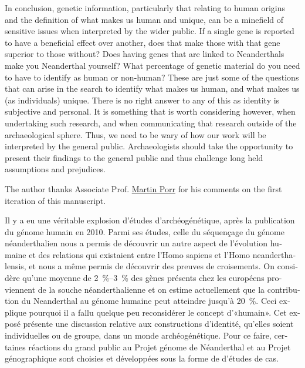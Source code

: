 
In conclusion, genetic information, particularly that relating to human origins and the definition of what makes us human and unique, can be a minefield of sensitive issues when interpreted by the wider public. If a single gene is reported to have a beneficial effect over another, does that make those with that gene superior to those without? Does having genes that are linked to Neanderthals make you Neanderthal yourself? What percentage of genetic material do you need to have to identify as human or non-human? These are just some of the questions that can arise in the search to identify what makes us human, and what makes us (as individuals) unique. There is no right answer to any of this as identity is subjective and personal. It is something that is worth considering however, when undertaking such research, and when communicating that research outside of the archaeological sphere. Thus, we need to be wary of how our work will be interpreted by the general public. Archaeologists should take the opportunity to present their findings to the general public and thus challenge long held assumptions and prejudices.

\myseparator
The author thanks Associate Prof. \href{https://uwa.academia.edu/MartinPorr}{Martin Porr} for his comments on the first iteration of this manuscript.


\begin{myabstract}
\foreignlanguage{french}{Il y a eu une véritable explosion d’études d’archéogénétique, après la publication du génome humain en 2010. Parmi ses études, celle du séquençage du génome néanderthalien nous a permis de découvrir un autre aspect de l’évolution humaine et des relations qui existaient entre l’Homo sapiens et l’Homo neanderthalensis, et nous a même permis de découvrir des preuves de croisements. 
On considère qu’une moyenne de \SIrange[range-phrase=--]{2}{3}{\percent} des gènes présents chez les européens proviennent de la souche
néanderthalienne et on estime actuellement que la contribution du Neanderthal au génome humaine peut atteindre jusqu’à \SI{20}{\percent}. 
Ceci explique pourquoi il a fallu quelque peu reconsidérer le concept d’«humain». 
Cet exposé présente une discussion relative aux constructions d’identité, qu’elles soient individuelles ou de groupe, dans un monde archéogénétique. Pour ce faire, certaines réactions du grand public au Projet génome de Néanderthal et au Projet génographique sont choisies et développées sous la forme de d’études de cas.}



\end{myabstract}
\printbibliography[heading=subbibnumbered] 
	\label{Maggio:lastpage}
\closingarticle
